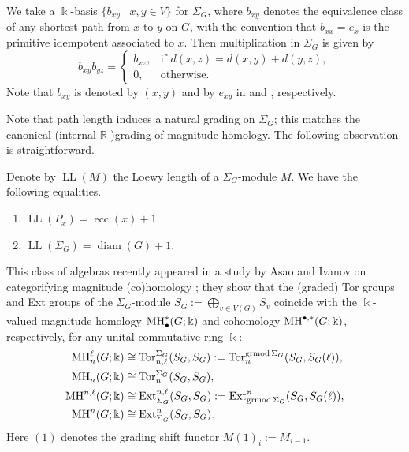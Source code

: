 \documentclass[a4paper,leqno]{amsart}
\begin{document}
We take a $\Bbbk$-basis $\{b_{xy}\mid x,y\in V\}$ for $\Sigma_G$,
where $b_{xy}$ denotes the equivalence class of any shortest path from $x$ to $y$ on $G$, with the convention that $b_{xx}=e_x$ is the primitive idempotent associated to $x$. Then multiplication in $\Sigma_G$ is given by
$$
b_{xy}b_{yz}=
\begin{cases}
b_{xz}, & \text{if } d(x,z)=d(x,y)+d(y,z),\\
0, & \text{otherwise}.
\end{cases}
$$
Note that $b_{xy}$ is denoted by $(x,y)$ and by $e_{xy}$ in \cite{AI24} and \cite{AW24}, respectively. 

\medskip

Note that path length induces a natural grading on $\Sigma_G$; this matches the canonical (internal $\mathbb{R}$-)grading of magnitude homology.  
The following observation is straightforward.

\begin{lem}\label{lem:Loewy legnth=ecc}
Denote by $\operatorname{LL}(M)$ the Loewy length of a $\Sigma_G$-module $M$.  We have the following equalities.
\begin{enumerate}
    \item $\operatorname{LL}(P_x)=\operatorname{ecc}(x)+1$.
    \item $\operatorname{LL}(\Sigma_G)=\operatorname{diam}(G)+1$. 
\end{enumerate}
\end{lem}

This class of algebras recently appeared in a study by Asao and Ivanov on categorifying magnitude (co)homology \cite[Theorem 6.2]{AI24}; they show that the (graded) Tor groups and Ext groups of the $\Sigma_G$-module $S_G:=\bigoplus_{v\in V(G)} S_v$ coincide with the $\Bbbk$-valued magnitude homology $\operatorname{MH}_\bullet^*(G;\Bbbk)$ and cohomology $\operatorname{MH}^{\bullet,*}(G;\Bbbk)$, respectively, for any unital commutative ring $\Bbbk$:
\begin{align*}
\operatorname{MH}_n^
\ell(G;\Bbbk) & \cong \operatorname{Tor}_{n,\ell}^{\Sigma_G}(S_G,S_G):=\operatorname{Tor}^{\operatorname{grmod}\Sigma_G}_{n}(S_G,S_G(\ell)), \\
\operatorname{MH}_n(G;\Bbbk) & \cong \operatorname{Tor}^{\Sigma_G}_{n}(S_G,S_G), \\
\operatorname{MH}^{n,\ell}(G;\Bbbk) & \cong \operatorname{Ext}^{n,\ell}_{\Sigma_G}(S_G,S_G):=\operatorname{Ext}_{\operatorname{grmod}\Sigma_G}^{n}(S_G,S_G(\ell)), \\
\operatorname{MH}^{n}(G;\Bbbk) & \cong \operatorname{Ext}_{\Sigma_G}^{n}(S_G,S_G).
\end{align*}
Here $(1)$ denotes the grading shift functor $M(1)_i := M_{i-1}$. 
\end{document}
